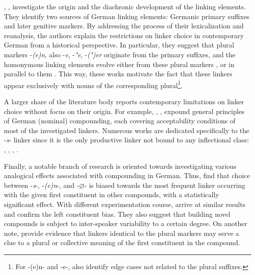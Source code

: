 \documentclass[10pt, a4paper]{article}
\newcommand{\zeroLinker}{\ensuremath{\boldsymbol{\varnothing}}}
\begin{document}
\citet{nuebling_szczepaniak_2013}, \citet{wegener_2003}, \citet{wegener_2005} investigate the origin and the diachronic development of the linking elements. They identify two sources of German linking elements: Germanic primary suffixes and later genitive markers. By addressing the process of their lexicalization and reanalysis, the authors explain the restrictions on linker choice in contemporary German from a historical perspective. In particular, they suggest that plural markers -\textit{(e)n}, also -\textit{e}, -\textit{"e}, \mbox{-\textit{(")er}} originate from the primary suffixes, and the homonymous linking elements evolve either from these plural markers \citep{nuebling_szczepaniak_2013}, or in parallel to them \citep{wegener_2003}. This way, these works motivate the fact that these linkers appear exclusively with nouns of the corresponding plural\footnote{For -(e)n- and -e-, \citet{nuebling_szczepaniak_2013} also identify edge cases not related to the plural suffixes.}.

A larger share of the literature body reports contemporary limitations on linker choice without focus on their origin. For example, \citet[chapter 6.2]{eisenberg_2013}, \citet[chapter A.5]{ortner_mueller-bollhagen_1991}, \citet[chapter 8.1]{schaefer_2018} expound general principles of German (nominal) compounding, each covering acceptability conditions of most of the investigated linkers. Numerous works are dedicated specifically to the \mbox{-\textit{s}-} linker since it is the only productive linker not bound to any inflectional class: \citet{libben_etal_2009}, \citet{kopf_2017}, \citet{kuerschner_2005}, \citet{nuebling_szczepaniak_2008}.


Finally, a notable branch of research is oriented towards investigating various analogical effects associated with compounding in German. Thus, \citet{krott_etal_2007} find that choice between \mbox{-\textit{s}-}, \mbox{-\textit{(e)n}-}, and \mbox{-{\zeroLinker}-} is biased towards the most frequent linker occurring with the given first constituent in other compounds, with a statistically significant effect. With different experimentation course, \citet{neef_borgwaldt_2012} arrive at similar results and confirm the left constituent bias. They also suggest that building novel compounds is subject to inter-speaker variability to a certain degree. On another note, \citet{schaefer_pankratz_2018} provide evidence that linkers identical to the plural markers may serve a clue to a plural or collective meaning of the first constituent in the compound.
\end{document}
